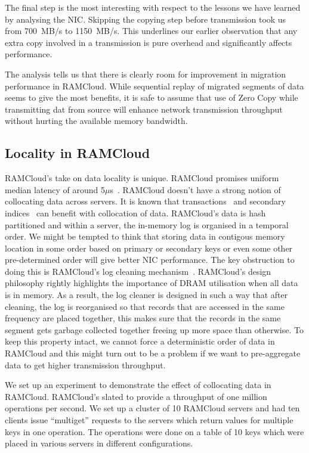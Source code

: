 The final step is the most interesting with respect to the lessons we have learned by analysing the NIC. Skipping the copying step before transmission took us from 700~MB/s to 
1150~MB/s. This underlines our earlier observation that any extra copy involved in a transmission is pure overhead and significantly affects performance. 

The analysis tells us that there is clearly room for improvement in migration performance in RAMCloud. While sequential replay of migrated segments of data seems to give the most benefits, 
it is safe to assume that use of Zero Copy while transmitting dat from source will enhance network transmission throughput without hurting the available memory bandwidth.


\subsection{Locality in RAMCloud}
RAMCloud's take on data locality is unique. RAMCloud promises uniform median latency of around 5$\mu$s~\cite{ramcloud}. RAMCloud doesn't have a strong notion of collocating data across servers. 
It is known that transactions~\cite{ramcloudtx} and secondary indices~\cite{slik} can benefit with collocation of data. RAMCloud's data is hash partitioned and within a server, the in-memory log is organised 
in a temporal order. We might be tempted to think that storing data in contigous memory location in some order based on primary or secondary keys or even some other pre-determined order will give better NIC performance. 
The key obstruction to doing this is RAMCloud's log cleaning mechanism~\cite{ramcloudfast}. RAMCloud's design philosophy rightly highlights the importance of DRAM utilisation when all data is in memory. 
As a result, the log cleaner is designed in such a way that after cleaning, the log is reorganised so that records that are accessed in the same frequency are placed together, this makes sure that the records in the same 
segment gets garbage collected together freeing up more space than otherwise. To keep this property intact, we cannot force a deterministic order of data in RAMCloud and this might turn out to be a problem if 
we want to pre-aggregate data to get higher transmission throughput.

We set up an experiment to demonstrate the effect of collocating data in RAMCloud. RAMCloud's slated to provide a throughput of one million operations per second. We set up a cluster of 10 RAMCloud servers 
and had ten clients issue ``multiget'' requests to the servers which return values for multiple keys in one operation. The operations were done on a table of 10 keys which were placed in various servers in different 
configurations. 

